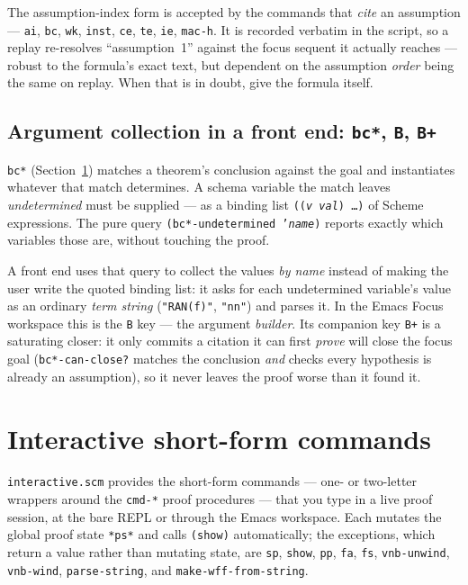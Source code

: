 \begin{remark}
The assumption-index form is accepted by the commands that \emph{cite} an
assumption --- \texttt{ai}, \texttt{bc}, \texttt{wk}, \texttt{inst},
\texttt{ce}, \texttt{te}, \texttt{ie}, \texttt{mac-h}.  It is recorded
verbatim in the script, so a replay re-resolves ``assumption~1'' against
the focus sequent it actually reaches --- robust to the formula's exact
text, but dependent on the assumption \emph{order} being the same on
replay.  When that is in doubt, give the formula itself.
\end{remark}

\subsection{Argument collection in a front end: \texttt{bc*}, \texttt{B}, \texttt{B+}}
\label{sec:bc-star-collection}

\texttt{bc*} (Section~\ref{sec:interactive}) matches a theorem's conclusion
against the goal and instantiates whatever that match determines.  A schema
variable the match leaves \emph{undetermined} must be supplied --- as a
binding list \texttt{((\textit{v}\ \textit{val})\ \ldots)} of Scheme
expressions.  The pure query \texttt{(bc*-undetermined '\textit{name})}
reports exactly which variables those are, without touching the proof.

A front end uses that query to collect the values \emph{by name} instead of
making the user write the quoted binding list: it asks for each undetermined
variable's value as an ordinary \emph{term string} (\texttt{"RAN(f)"},
\texttt{"nn"}) and parses it.  In the Emacs Focus workspace this is the
\texttt{B} key --- the argument \emph{builder}.  Its companion key
\texttt{B+} is a saturating closer: it only commits a citation it
can first \emph{prove} will close the focus goal
(\texttt{bc*-can-close?} matches the conclusion \emph{and} checks every
hypothesis is already an assumption), so it never leaves the proof worse
than it found it.

\section{Interactive short-form commands}
\label{sec:interactive}

\texttt{interactive.scm} provides the short-form commands --- one- or two-letter
wrappers around the \texttt{cmd-*} proof procedures --- that you type in a live
proof session, at the bare REPL or through the Emacs workspace.  Each mutates the
global proof state \texttt{*ps*} and calls \texttt{(show)} automatically; the
exceptions, which return a value rather than mutating state, are \texttt{sp},
\texttt{show}, \texttt{pp}, \texttt{fa}, \texttt{fs}, \texttt{vnb-unwind},
\texttt{vnb-wind}, \texttt{parse-string}, and \texttt{make-wff-from-string}.


